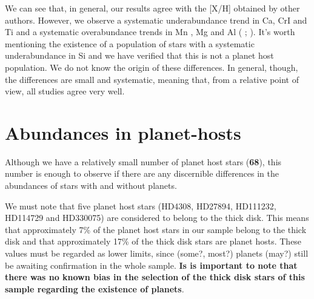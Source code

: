 \documentclass[oldversion]{aa}
\begin{document}
We can see that, in general, our results agree with the [X/H] obtained by other authors. However, we observe a systematic underabundance trend in Ca, CrI \citep{Gilli-2006} and Ti \citep{Valenti-2005} and a systematic overabundance trends in Mn \citep{Gilli-2006}, Mg and Al (\citeauthor{Gilli-2006} \citeyear{Gilli-2006}; \citeauthor{Bensby-2005} \citeyear{Bensby-2005}). It's worth mentioning the existence of a population of stars with a systematic underabundance in Si \citep{Valenti-2005} and we have verified that this is not a planet host population. We do not know the origin of these differences. In general, though, the differences are small and systematic, meaning that, from a relative point of view, all studies agree very well.




\section{Abundances in planet-hosts}
\label{sec:planet}



Although we have a relatively small number of planet host stars (\textbf{68}), this number is enough to observe if there are any discernible differences in the abundances of stars with and without planets. %

We must note that five planet host stars (HD4308, HD27894, HD111232, HD114729 and HD330075) are considered to belong to the thick disk. This means that approximately 7\% of the planet host stars in our sample belong to the thick disk and that approximately 17\% of the thick disk stars are planet hosts. These values must be regarded as lower limits, since (some?, most?) planets (may?) still be awaiting confirmation in the whole sample. \textbf{Is is important to note that there was no known bias in the selection of the thick disk stars of this sample regarding the existence of planets}.
\end{document}
